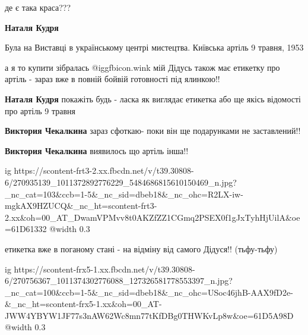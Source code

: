  
 
 
 
 

де є така краса???

\textbf{Наталя Кудря} 

Була на Виставці в українському центрі мистецтва. Київська артіль 9 травня, 1953


а я то купити зібралась @igg{fbicon.wink}  мій Дідусь також має етикетку про
артіль - зараз вже в повній бойвій готовності під ялинкою!!

\textbf{Наталя Кудря} покажіть будь - ласка як виглядає етикетка або ще якісь відомості про артіль 9 травня

\textbf{Виктория Чекалкина} зараз сфоткаю- поки він ще подарунками не заставлений!!

\textbf{Виктория Чекалкина} виявилось що артіль інша!!

\ifcmt
  ig https://scontent-frt3-2.xx.fbcdn.net/v/t39.30808-6/270935139_1011372892776229_5484686815610150469_n.jpg?_nc_cat=103&ccb=1-5&_nc_sid=dbeb18&_nc_ohc=R2LX-iw-mgkAX9HZUCQ&_nc_ht=scontent-frt3-2.xx&oh=00_AT_DwamVPMvv8t0AKZfZZ1CGmq2PSEX0f1gJxTyhHjUilA&oe=61D61332
  @width 0.3
\fi

етикетка вже в поганому стані - на відміну від самого Дідуся!! (тьфу-тьфу)

\ifcmt
  ig https://scontent-frx5-1.xx.fbcdn.net/v/t39.30808-6/270756367_1011374302776088_127326581778553397_n.jpg?_nc_cat=100&ccb=1-5&_nc_sid=dbeb18&_nc_ohc=USoc46jhB-AAX9fD2e-&_nc_ht=scontent-frx5-1.xx&oh=00_AT-JWW4YBYW1JF77s3nAW62Wc8mn77tKfDBg0THWKvLp8w&oe=61D5A98D
  @width 0.3
\fi
